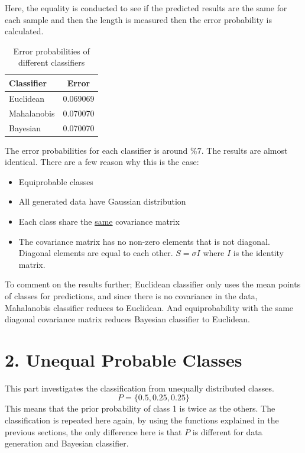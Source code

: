 \documentclass[11pt]{article}
\begin{document}
Here, the equality is conducted to see if the predicted results are the same for each sample and then the length is measured then the error probability is calculated.

\bgroup
\def\arraystretch{1.5}%
\begin{table}[H]
\centering
\caption{Error probabilities of different classifiers}
\begin{tabular}{|l|c|}
\hline
\textbf{Classifier}   & \textbf{Error}\\ \hline
Euclidean    & 0.069069\\ \hline
Mahalanobis  & 0.070070\\ \hline
Bayesian     & 0.070070\\ \hline
\end{tabular}
\label{errq1}
\end{table}
\egroup

The error probabilities for each classifier is around $\%7$. The results are almost identical. There are a few reason why this is the case:
\begin{itemize}
    \item Equiprobable classes
    \item All generated data have Gaussian distribution
    \item Each class share the \underline{same} covariance matrix
    \item The covariance matrix has no non-zero elements that is not diagonal. Diagonal elements are equal to each other. $S =\sigma I $ where $I$ is the identity matrix.
\end{itemize}

To comment on the results further; Euclidean classifier only uses the mean points of classes for predictions, and since there is no covariance in the data, Mahalanobis classifier reduces to Euclidean. And equiprobability with the same diagonal covariance matrix reduces Bayesian classifier to Euclidean.

\section*{2. Unequal Probable Classes}
This part investigates the classification from unequally distributed classes.
$$
P=\{0.5,0.25,0.25\}
$$
This means that the prior probability of class 1 is twice as the others. The classification is repeated here again, by using the functions explained in the previous sections, the only difference here is that $P$ is different for data generation and Bayesian classifier. \medskip
\end{document}
